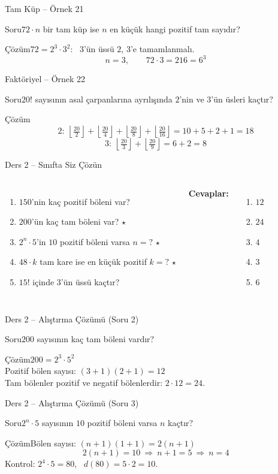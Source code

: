 \documentclass[aspectratio=169,11pt]{beamer}
\newcommand{\soru}[3]{%
\begin{frame}{#1}
  \begin{block}{Soru}\large #2\end{block}
  \pause
  \begin{exampleblock}{Çözüm}\large #3\end{exampleblock}
\end{frame}}
\begin{document}
\soru{Tam Küp -- Örnek 21}
{\(72\cdot n\) bir tam küp ise \(n\) en küçük hangi pozitif tam sayıdır?}
{\(72=2^3\cdot 3^2\): \ \(3\)'ün üssü \(2\), \(3\)'e tamamlanmalı.
\[n=3,\qquad 72\cdot 3=216=6^3\]}

\soru{Faktöriyel -- Örnek 22}
{\(20!\) sayısının asal çarpanlarına ayrılışında \(2\)'nin ve \(3\)'ün üsleri kaçtır?}
{\[2:\ \left\lfloor\tfrac{20}{2}\right\rfloor+\left\lfloor\tfrac{20}{4}\right\rfloor+\left\lfloor\tfrac{20}{8}\right\rfloor+\left\lfloor\tfrac{20}{16}\right\rfloor=10+5+2+1=18\]
\[3:\ \left\lfloor\tfrac{20}{3}\right\rfloor+\left\lfloor\tfrac{20}{9}\right\rfloor=6+2=8\]}

\begin{frame}{Ders 2 -- Sınıfta Siz Çözün}
\begin{columns}[t]
\begin{enumerate}
\item \(150\)'nin kaç pozitif böleni var?
\item \(200\)'ün kaç tam böleni var? \(\star\)
\item \(2^n\cdot 5\)'in \(10\) pozitif böleni varsa \(n=?\) \(\star\)
\item \(48\cdot k\) tam kare ise en küçük pozitif \(k=?\) \(\star\)
\item \(15!\) içinde \(3\)'ün üssü kaçtır?
\end{enumerate}
\pause
\textbf{Cevaplar:}
\begin{enumerate}
\item \(12\)
\item \(24\)
\item \(4\)
\item \(3\)
\item \(6\)
\end{enumerate}
\end{columns}
\vspace{4pt}{\footnotesize \(\star\) işaretli soruların adım adım çözümü sonraki slaytlardadır.}
\end{frame}

\soru{Ders 2 -- Alıştırma Çözümü (Soru 2)}
{\(200\) sayısının kaç tam böleni vardır?}
{\(200=2^3\cdot 5^2\)\\[3pt]
Pozitif bölen sayısı: \((3+1)(2+1)=12\)\\[3pt]
Tam bölenler pozitif ve negatif bölenlerdir: \(2\cdot 12=24\).}

\soru{Ders 2 -- Alıştırma Çözümü (Soru 3)}
{\(2^n\cdot 5\) sayısının \(10\) pozitif böleni varsa \(n\) kaçtır?}
{Bölen sayısı: \((n+1)(1+1)=2(n+1)\)
\[2(n+1)=10\ \Rightarrow\ n+1=5\ \Rightarrow\ n=4\]
Kontrol: \(2^4\cdot 5=80\), \ \(d(80)=5\cdot 2=10\).}
\end{document}
